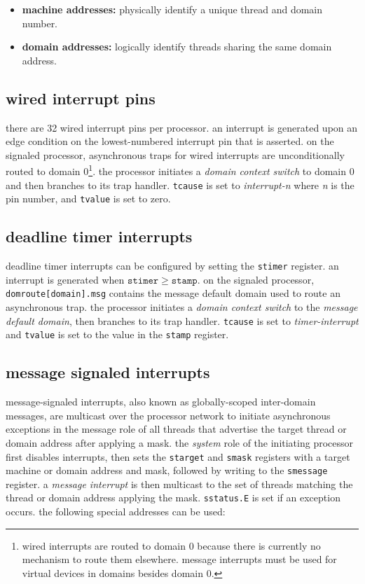 \begin{itemize}[itemsep=0pt]
\item \textbf{machine addresses:} physically identify a unique thread
and domain number.
\item \textbf{domain addresses:} logically identify threads sharing the
same domain address.
\end{itemize}

\newpage
\subsection{wired interrupt pins}

there are 32 wired interrupt pins per processor. an interrupt is
generated upon an edge condition on the lowest-numbered interrupt pin
that is asserted. on the signaled processor, asynchronous traps for
wired interrupts are unconditionally routed to domain 0\footnote{wired
interrupts are routed to domain 0 because there is currently no mechanism
to route them elsewhere. message interrupts must be used for virtual
devices in domains besides domain 0.}. the processor initiates a
\emph{domain context switch} to domain 0 and then branches to its trap
handler. \texttt{tcause} is set to \emph{interrupt-n} where \emph{n} is
the pin number, and \texttt{tvalue} is set to zero.

\subsection{deadline timer interrupts}

deadline timer interrupts can be configured by setting the \texttt{stimer}
register. an interrupt is generated when $\mathtt{stimer} \ge \mathtt{stamp}$.
on the signaled processor, \texttt{domroute[domain].msg}
contains the message default domain used to route an asynchronous trap.
the processor initiates a \emph{domain context switch} to the
\emph{message default domain}, then branches to its trap handler.
\texttt{tcause} is set to \emph{timer-interrupt} and \texttt{tvalue} is set
to the value in the \texttt{stamp} register.

\subsection{message signaled interrupts}

message-signaled interrupts, also known as globally-scoped inter-domain
messages, are multicast over the processor network to initiate asynchronous
exceptions in the message role of all threads that advertise the target
thread or domain address after applying a mask.
\para
the \emph{system} role of the initiating processor first disables
interrupts, then sets the \texttt{starget} and \texttt{smask} registers
with a target machine or domain address and mask, followed by writing to
the \texttt{smessage} register. a \emph{message interrupt} is then multicast
to the set of threads matching the thread or domain address applying the mask.
\texttt{sstatus.E} is set if an exception occurs.
\para
the following special addresses can be used:

